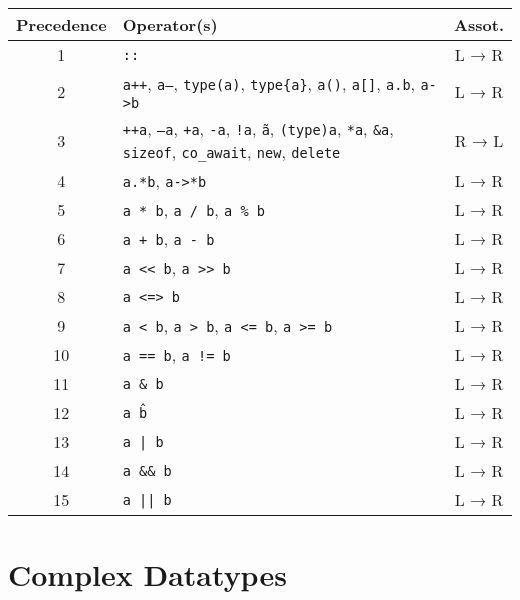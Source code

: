 \begin{tabular}{|c|p{5cm}|c|}
\hline
\textbf{Precedence} & \textbf{Operator(s)} & \textbf{Assot.} \\ \hline
1 & \texttt{::} & L → R \\ \hline
2 & \texttt{a++}, \texttt{a--}, \texttt{type(a)}, \texttt{type\{a\}}, \texttt{a()}, \texttt{a[]}, 
\texttt{a.b}, \texttt{a->b} & L → R \\ \hline
3 & \texttt{++a}, \texttt{--a}, \texttt{+a}, \texttt{-a}, \texttt{!a}, \texttt{\~a}, 
\texttt{(type)a}, \texttt{*a}, \texttt{\&a}, \texttt{sizeof}, 
\texttt{co\_await}, \texttt{new}, \texttt{delete} & R → L \\ \hline
4 & \texttt{a.*b}, \texttt{a->*b} & L → R \\ \hline
5 & \texttt{a * b}, \texttt{a / b}, \texttt{a \% b} & L → R \\ \hline
6 & \texttt{a + b}, \texttt{a - b} & L → R \\ \hline
7 & \texttt{a << b}, \texttt{a >> b} & L → R \\ \hline
8 & \texttt{a <=> b} & L → R \\ \hline
9 & \texttt{a < b}, \texttt{a > b}, \texttt{a <= b}, \texttt{a >= b} & L → R \\ \hline
10 & \texttt{a == b}, \texttt{a != b} & L → R \\ \hline
11 & \texttt{a \& b} & L → R \\ \hline
12 & \texttt{a \^ b} & L → R \\ \hline
13 & \texttt{a | b} & L → R \\ \hline
14 & \texttt{a \&\& b} & L → R \\ \hline
15 & \texttt{a || b} & L → R \\ \hline

\end{tabular}



\section{Complex Datatypes}

